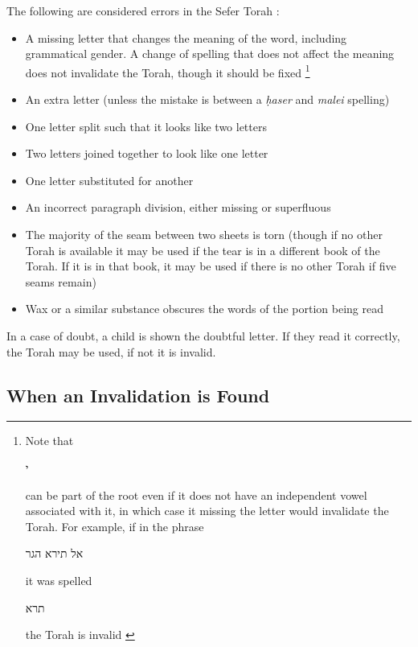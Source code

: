 \documentclass[11pt]{article}
\newcommand{\hebword}[1]{‎\begin{hebrew}\beginR #1 \endR\end{hebrew}}
\begin{document}
The following are considered errors in the Sefer Torah \parencite[24:1]{Kitzur}:
\begin{itemize}
	\item A missing letter that changes the meaning of the word, including grammatical gender. A change of spelling that does not affect the meaning does not invalidate the Torah, though it should be fixed \footnote{Note that\hebword{ י } can be part of the root even if it does not have an independent vowel associated with it, in which case it missing the letter would invalidate the Torah.  For example, if in the phrase \hebword{אל תירא הגר} it was spelled \hebword{תרא} the Torah is invalid \parencite*[24:1]{Kitzur}}
	\item An extra letter (unless the mistake is between a \textit{\d{h}aser} and \textit{malei} spelling)
	\item One letter split such that it looks like two letters
	\item Two letters joined together to look like one letter
	\item One letter substituted for another
	\item An incorrect paragraph division, either missing or superfluous
	\item The majority of the seam between two sheets is torn (though if no other Torah is available it may be used if the tear is in a different book of the Torah.  If it is in that book, it may be used if there is no other Torah if five seams remain)
	\item Wax or a similar substance obscures the words of the portion being read
\end{itemize}

In a case of doubt, a child is shown the doubtful letter.  If they read it correctly, the Torah may be used, if not it is invalid.

\subsection{When an Invalidation is Found}
\end{document}
